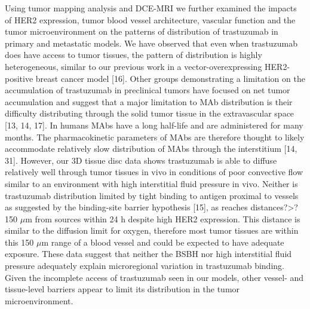 Using tumor mapping analysis and DCE-MRI we further examined the impacts of HER2 expression, tumor blood vessel architecture, vascular function and the tumor microenvironment on the patterns of distribution of trastuzumab in primary and metastatic models.
We have observed that even when trastuzumab does have access to tumor tissues, the pattern of distribution is highly heterogeneous, similar to our previous work in a vector-overexpressing HER2-positive breast cancer model [16].
Other groups demonstrating a limitation on the accumulation of trastuzumab in preclinical tumors have focused on net tumor accumulation and suggest that a major limitation to MAb distribution is their difficulty distributing through the solid tumor tissue in the extravascular space [13, 14, 17].
In humans MAbs have a long half-life and are administered for many months.
The pharmacokinetic parameters of MAbs are therefore thought to likely accommodate relatively slow distribution of MAbs through the interstitium [14, 31].
However, our 3D tissue disc data shows trastuzumab is able to diffuse relatively well through tumor tissues in vivo in conditions of poor convective flow similar to an environment with high interstitial fluid pressure in vivo.
Neither is trastuzumab distribution limited by tight binding to antigen proximal to vessels as suggested by the binding-site barrier hypothesis [15], as reaches distances?>?150 $\mu$m from sources within 24 h despite high HER2 expression.
This distance is similar to the diffusion limit for oxygen, therefore most tumor tissues are within this 150 $\mu$m range of a blood vessel and could be expected to have adequate exposure.
These data suggest that neither the BSBH nor high interstitial fluid pressure adequately explain microregional variation in trastuzumab binding.
Given the incomplete access of trastuzumab seen in our models, other vessel- and tissue-level barriers appear to limit its distribution in the tumor microenvironment.

